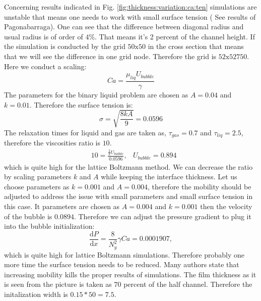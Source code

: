 \documentclass{article}
\begin{document}
Concerning results indicated in Fig.
\ref{fig:thickness:variation:ca:ten} simulations are unstable that means one needs to work with
small surface tension ({\color{red} See results of Pagonabarraga}). One can see that the difference
between diagonal radius and
usual radius is of order of $4\%$. That means it's 2 percent of the channel height. If the
simulation is conducted by the grid $50\mathrm{x}50$ in the cross section that means that we will
see the difference in one grid node. Therefore the grid is $52\mathrm{x}52\mathrm{750}$. Here we
conduct a scaling:
\begin{equation}
Ca=\frac{\mu_{liq} U_{bubble}}{\gamma}
\end{equation}
The parameters for the binary liquid problem are chosen as $A=0.04$ and $k=0.01$. Therefore the
surface tension is:
\begin{equation}
\sigma = \sqrt{\frac{8 k A}{9}}=0.0596
\end{equation}
The relaxation times for liquid and gas are taken as, $\tau_{gas}=0.7$ and $\tau_{liq}=2.5$,
therefore the viscosities ratio is $10$.
\begin{equation}
\begin{aligned}
&10=\frac{\frac{2}{3} U_{bubble}}{0.0596},
&U_{bubble}=0.894
\end{aligned}
\end{equation}
which is quite high for the lattice Boltzmann method. We can decrease the ratio by scaling
parameters $k$ and $A$ while keeping the interface thickness. Let us choose parameters as $k=0.001$
and $A=0.004$, therefore the mobility should be adjusted to address the issue with small parameters
and small surface tension in this case. It parameters are chosen as $A=0.004$ and $k=0.001$ then
the velocity of the bubble is  $0.0894$. Therefore we can adjust the pressure gradient to plug it
into the bubble initialization:
\begin{equation}
\frac{\mathrm{d}P}{\mathrm{d}x}=\frac{8}{N_y^2} \gamma Ca=0.0001907,
\end{equation}
which is quite high for lattice Boltzmann simulations. Therefore probably one more time the surface
tension needs to be reduced. {\color{red} Many authors state that increasing mobility kills the
proper results of simulations}. 
The film thickness as it is seen from the picture is taken as $70$ percent of the half channel.
Therefore the initalization width is $0.15*50=7.5$. 
\end{document}
